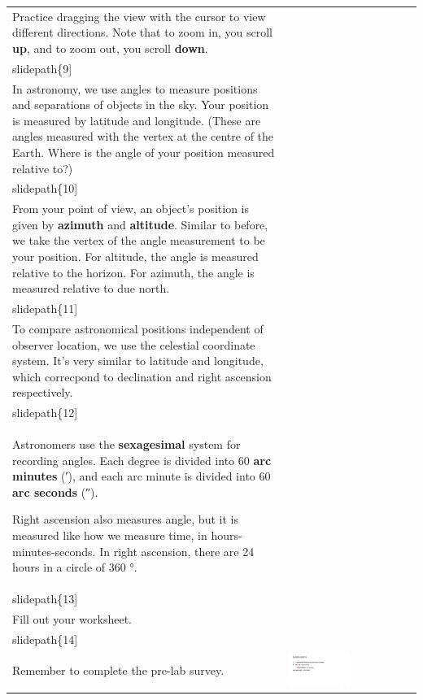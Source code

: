 \documentclass[12pt]{article}
\begin{document}
\begin{longtable}{|m{}|m{}|}
Practice dragging the view with the cursor to view different directions. Note that to zoom in, you scroll \textbf{up}, and to zoom out, you scroll \textbf{down}. & \texttt{[image: \\slidepath\{9]}}\\\hline
In astronomy, we use angles to measure positions and separations of objects in the sky. Your position is measured by latitude and longitude. (These are angles measured with the vertex at the centre of the Earth. Where is the angle of your position measured relative to?) & \texttt{[image: \\slidepath\{10]}}\\\hline
From your point of view, an object's position is given by \textbf{azimuth} and \textbf{altitude}. Similar to before, we take the vertex of the angle measurement to be your position. For altitude, the angle is measured relative to the horizon. For azimuth, the angle is measured relative to due north. & \texttt{[image: \\slidepath\{11]}}\\\hline
To compare astronomical positions independent of observer location, we use the celestial coordinate system. It's very similar to latitude and longitude, which correcpond to declination and right ascension respectively. & \texttt{[image: \\slidepath\{12]}}\\\hline
Astronomers use the \textbf{sexagesimal} system for recording angles. Each degree is divided into 60 \textbf{arc minutes} (\si{\arcminute}), and each arc minute is divided into 60 \textbf{arc seconds} (\si{\arcsecond}).

Right ascension also measures angle, but it is measured like how we measure time, in hours-minutes-seconds. In right ascension, there are 24 hours in a circle of 360 \si{\degree}. & \texttt{[image: \\slidepath\{13]}}\\\hline
Fill out your worksheet. & \texttt{[image: \\slidepath\{14]}}\\\hline


Remember to complete the pre-lab survey. & \includegraphics[width=0.5\textwidth]{ppt/lab01/Slide15.jpeg}\\\hline
\end{longtable}
\end{document}
